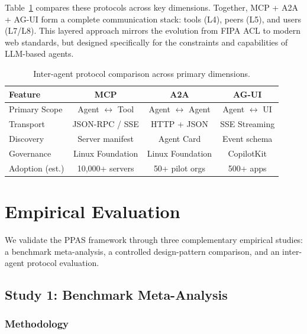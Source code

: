 \documentclass[review]{elsarticle}
\theoremstyle{definition}
\begin{document}
Table~\ref{tab:protocols} compares these protocols across key dimensions. Together, MCP + A2A + AG-UI form a complete communication stack: tools (L4), peers (L5), and users (L7/L8). This layered approach mirrors the evolution from FIPA ACL \citep{fipa2002acl} to modern web standards, but designed specifically for the constraints and capabilities of LLM-based agents.

\begin{table}[ht]
\centering
\caption{Inter-agent protocol comparison across primary dimensions.}
\label{tab:protocols}
\begin{tabular}{lccc}
\toprule
\textbf{Feature} & \textbf{MCP} & \textbf{A2A} & \textbf{AG-UI} \\
\midrule
Primary Scope        & Agent $\leftrightarrow$ Tool & Agent $\leftrightarrow$ Agent & Agent $\leftrightarrow$ UI \\
Transport            & JSON-RPC / SSE               & HTTP + JSON                   & SSE Streaming \\
Discovery            & Server manifest              & Agent Card                    & Event schema \\
Governance           & Linux Foundation             & Linux Foundation              & CopilotKit \\
Adoption (est.)      & 10,000+ servers              & 50+ pilot orgs                & 500+ apps \\
\bottomrule
\end{tabular}
\end{table}

\section{Empirical Evaluation}\label{sec:evaluation}

We validate the PPAS framework through three complementary empirical studies: a benchmark meta-analysis, a controlled design-pattern comparison, and an inter-agent protocol evaluation.

\subsection{Study 1: Benchmark Meta-Analysis}\label{sec:benchmarks}

\subsubsection{Methodology}
\end{document}
